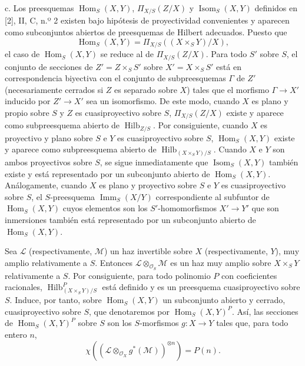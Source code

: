 \medskip
\noindent c. Los preesquemas $\operatorname{Hom}_S(X,Y)$,
$\Pi_{X/S}(Z/X)$ y $\operatorname{Isom}_S(X,Y)$ definidos en [2], II, C,
n.º 2 existen bajo hipótesis de proyectividad convenientes y aparecen como
subconjuntos abiertos de preesquemas de Hilbert adecuados. Puesto que
\[
\operatorname{Hom}_S(X,Y)=\Pi_{X/S}((X\times_SY)/X),
\]
el caso de $\operatorname{Hom}_S(X,Y)$ se reduce al de
$\Pi_{X/S}(Z/X)$. Para todo $S'$ sobre $S$, el conjunto de secciones de
$Z'=Z\times_SS'$ sobre $X'=X\times_SS'$ está en correspondencia biyectiva con
el conjunto de subpreesquemas $\Gamma$ de $Z'$ (necesariamente cerrados si $Z$
es separado sobre $X$) tales que el morfismo $\Gamma\longrightarrow X'$
inducido por $Z'\longrightarrow X'$ sea un isomorfismo. De este modo,
cuando $X$ es plano y propio sobre $S$ y $Z$ es cuasiproyectivo sobre $S$,
$\Pi_{X/S}(Z/X)$ existe y aparece como subpreesquema abierto de
$\operatorname{Hilb}_{Z/S}$. Por consiguiente, cuando $X$ es proyectivo y
plano sobre $S$ e $Y$ es cuasiproyectivo sobre $S$,
$\operatorname{Hom}_S(X,Y)$ existe y aparece como subpreesquema abierto de
$\operatorname{Hilb}_{(X\times_SY)/S}$. Cuando $X$ e $Y$ son ambos
proyectivos sobre $S$, se sigue inmediatamente que
$\operatorname{Isom}_S(X,Y)$ también existe y está representado por un
subconjunto abierto de $\operatorname{Hom}_S(X,Y)$. Análogamente, cuando $X$
es plano y proyectivo sobre $S$ e $Y$ es cuasiproyectivo sobre $S$, el
$S$-preesquema $\operatorname{Imm}_S(X/Y)$ correspondiente al subfuntor de
$\operatorname{Hom}_S(X,Y)$ cuyos elementos son los $S'$-homomorfismos
$X'\longrightarrow Y'$ que son inmersiones también está representado por un
subconjunto abierto de $\operatorname{Hom}_S(X,Y)$.

Sea $\mathcal L$ (respectivamente, $\mathcal M$) un haz invertible sobre $X$
(respectivamente, $Y$), muy amplio relativamente a $S$. Entonces
$\mathcal L\otimes_{\mathcal O_S}\mathcal M$ es un haz muy amplio sobre
$X\times_SY$ relativamente a $S$. Por consiguiente, para todo polinomio $P$
con coeficientes racionales, $\operatorname{Hilb}^P_{(X\times_SY)/S}$ está
definido y es un preesquema cuasiproyectivo sobre $S$. Induce, por tanto,
sobre $\operatorname{Hom}_S(X,Y)$ un subconjunto abierto y cerrado,
cuasiproyectivo sobre $S$, que denotaremos por
$\operatorname{Hom}_S(X,Y)^P$. Así, las secciones de
$\operatorname{Hom}_S(X,Y)^P$ sobre $S$ son los $S$-morfismos
$g:X\longrightarrow Y$ tales que, para todo entero $n$,
\[
\chi\!\left(\left(\mathcal L\otimes_{\mathcal O_X}g^*(\mathcal M)\right)^{
\otimes n}\right)=P(n).
\]

